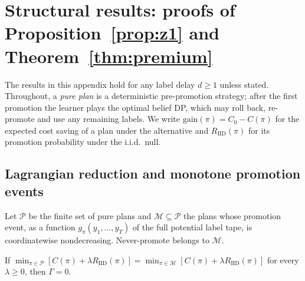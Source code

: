 \section{Structural results: proofs of Proposition~\ref{prop:z1} and Theorem~\ref{thm:premium}}
\label{app:structure}

The results in this appendix hold for any label delay $d\ge1$ unless stated. Throughout, a \emph{pure plan} is a deterministic pre-promotion strategy; after the first promotion the learner plays the optimal belief DP, which may roll back, re-promote and use any remaining labels. We write $\mathrm{gain}(\pi)=C_0-C(\pi)$ for the expected cost saving of a plan under the alternative and $R_{\mathrm{IID}}(\pi)$ for its promotion probability under the i.i.d.\ null.

\subsection{Lagrangian reduction and monotone promotion events}

Let $\mathcal P$ be the finite set of pure plans and $\mathcal M\subseteq\mathcal P$ the plans whose promotion event, as a function $g_\pi(y_1,\dots,y_T)$ of the full potential label tape, is coordinatewise nondecreasing. Never-promote belongs to $\mathcal M$.

\begin{lemma}
\label{lem:R}
If $\min_{\pi\in\mathcal P}[C(\pi)+\lambda R_{\mathrm{IID}}(\pi)]=\min_{\pi\in\mathcal M}[C(\pi)+\lambda R_{\mathrm{IID}}(\pi)]$ for every $\lambda\ge0$, then $\Gamma=0$.
\end{lemma}

